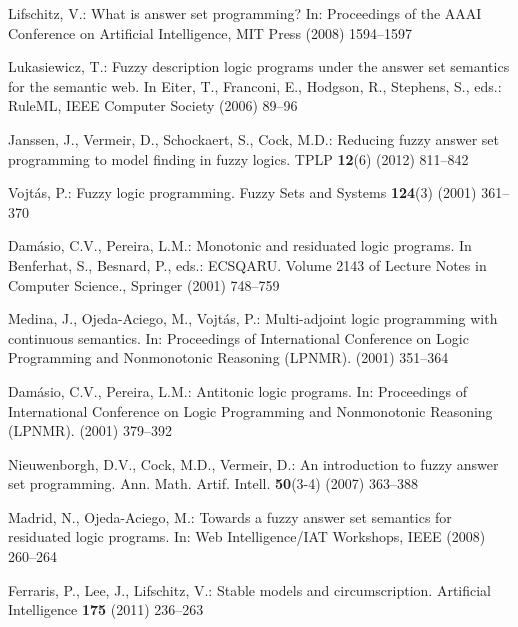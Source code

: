 \documentclass[runningheads]{llncs}
\begin{document}
\begin{thebibliography}{10}

Lifschitz, V.:
\newblock What is answer set programming?
\newblock In: Proceedings of the AAAI Conference on Artificial Intelligence,
  MIT Press (2008)  1594--1597

Lukasiewicz, T.:
\newblock Fuzzy description logic programs under the answer set semantics for
  the semantic web.
\newblock In Eiter, T., Franconi, E., Hodgson, R., Stephens, S., eds.: RuleML,
  IEEE Computer Society (2006)  89--96

Janssen, J., Vermeir, D., Schockaert, S., Cock, M.D.:
\newblock Reducing fuzzy answer set programming to model finding in fuzzy
  logics.
\newblock TPLP \textbf{12}(6) (2012)  811--842

Vojt{\'a}s, P.:
\newblock Fuzzy logic programming.
\newblock Fuzzy Sets and Systems \textbf{124}(3) (2001)  361--370

Dam{\'a}sio, C.V., Pereira, L.M.:
\newblock Monotonic and residuated logic programs.
\newblock In Benferhat, S., Besnard, P., eds.: ECSQARU. Volume 2143 of Lecture
  Notes in Computer Science., Springer (2001)  748--759

Medina, J., Ojeda-Aciego, M., Vojt{\'a}s, P.:
\newblock Multi-adjoint logic programming with continuous semantics.
\newblock In: Proceedings of International Conference on Logic Programming and
  Nonmonotonic Reasoning ({LPNMR}). (2001)  351--364

Dam{\'a}sio, C.V., Pereira, L.M.:
\newblock Antitonic logic programs.
\newblock In: Proceedings of International Conference on Logic Programming and
  Nonmonotonic Reasoning ({LPNMR}). (2001)  379--392

Nieuwenborgh, D.V., Cock, M.D., Vermeir, D.:
\newblock An introduction to fuzzy answer set programming.
\newblock Ann. Math. Artif. Intell. \textbf{50}(3-4) (2007)  363--388

Madrid, N., Ojeda-Aciego, M.:
\newblock Towards a fuzzy answer set semantics for residuated logic programs.
\newblock In: Web Intelligence/IAT Workshops, IEEE (2008)  260--264

Ferraris, P., Lee, J., Lifschitz, V.:
\newblock Stable models and circumscription.
\newblock Artificial Intelligence \textbf{175} (2011)  236--263


\end{thebibliography}
\end{document}
